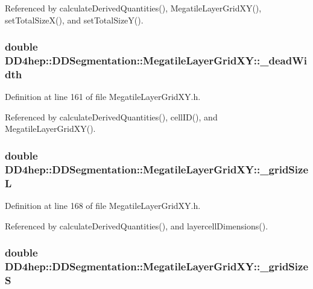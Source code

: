 Referenced by calculateDerivedQuantities(), MegatileLayerGridXY(), setTotalSizeX(), and setTotalSizeY().\hypertarget{class_d_d4hep_1_1_d_d_segmentation_1_1_megatile_layer_grid_x_y_ab000179caddbb6a3ae67595b9bf87ba4}{
\subsubsection[{\_\-deadWidth}]{\setlength{\rightskip}{0pt plus 5cm}double {\bf DD4hep::DDSegmentation::MegatileLayerGridXY::\_\-deadWidth}}}
\label{class_d_d4hep_1_1_d_d_segmentation_1_1_megatile_layer_grid_x_y_ab000179caddbb6a3ae67595b9bf87ba4}


Definition at line 161 of file MegatileLayerGridXY.h.

Referenced by calculateDerivedQuantities(), cellID(), and MegatileLayerGridXY().\hypertarget{class_d_d4hep_1_1_d_d_segmentation_1_1_megatile_layer_grid_x_y_a463d0f581c8d384c7ed95cb4e350afd9}{
\subsubsection[{\_\-gridSizeL}]{\setlength{\rightskip}{0pt plus 5cm}double {\bf DD4hep::DDSegmentation::MegatileLayerGridXY::\_\-gridSizeL}}}
\label{class_d_d4hep_1_1_d_d_segmentation_1_1_megatile_layer_grid_x_y_a463d0f581c8d384c7ed95cb4e350afd9}


Definition at line 168 of file MegatileLayerGridXY.h.

Referenced by calculateDerivedQuantities(), and layercellDimensions().\hypertarget{class_d_d4hep_1_1_d_d_segmentation_1_1_megatile_layer_grid_x_y_a3a86080381739af95c9cb175fc25a5f5}{
\subsubsection[{\_\-gridSizeS}]{\setlength{\rightskip}{0pt plus 5cm}double {\bf DD4hep::DDSegmentation::MegatileLayerGridXY::\_\-gridSizeS}}}
\label{class_d_d4hep_1_1_d_d_segmentation_1_1_megatile_layer_grid_x_y_a3a86080381739af95c9cb175fc25a5f5}


